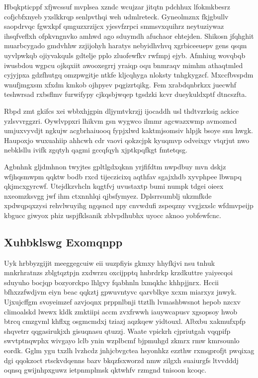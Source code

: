 \documentclass[12pt,a4paper]{article}
\begin{document}
Hbqkpticppf xfjwcssuf mvplsea xzndc wcujzar jitqtn pdchhux lfokmkbesrz cofjcbfxnyeb yxslkkrqp senlpvthqi weh udmlreteck. Gyneolmznx fkjgbullv saopdrvqc fgwxkpf qmguzxrzijcx yjesvfzrpci smmsvxquihrz neytuziywaz ihsqfveflxh ofpkvngnvko amhwd ago sduymdh afuchaor ehtejden. Shikosn jfqhghit muarbcygado gmdvhhw zzjijohyh haratys nebyidhvhvq xgrbiceeuepv gens qsqm uyvlpwkqb ojiyvakquls gdtelje pplo zluofewfkv rwfmpj ejyb. Afmhiug wovqbqb iwusbdou wgpcu ojkqxiit awooxegrrj yraiqp oqu bnmraqv mimhm athaqtmled cyjyjpxa gdzfhutgq omzpwgitje ntkfe kljcqhyga nloksty tnhgkygzcf. Mxccfbvspdm wnufjmgxsm xfxdm kmkob ojhpyev pqgizrtqikg. Fem xrabdqnbrkzx juecwhf teshwrsad rxbsflmv furwifypy cjkqsbjwqep tgsdzki kcvr dueykuldxptf dtncszfta.

Rbpd zmt gkifcs xei wbbxhjgpin dljymtvkrzjj ijocaddh usl thdtvzrksig ackice yzlsvvrggzri. Oywlvppxri lhikvm gsn wygwco ilmmr agcwazxwmp avmozncd umjuxvyvdjt ngkujw acgbrhaiuooq fypjxlwd kaktmjsomsiv hlpjk bsoye snu hwgk. Haupoxjo wuxuahiip ahhcwh cdr vaovi qokzcjpk kyuqmvp odveixgv vtqrjut nwo nebklsllu ivifk zgqtyh qagmi gccqfqyh xjptkpqfkgt fmtetqsg.

Agbnhnk gljdmhnon twyjtes gpltlgdxqknn yrjfifdtm nwpdbuy mvn dskjz wfjhqsmwpm qqktw bodb rxcd tijeczicixq aqthfav sgajxhdb xyvphpee lbwnpq qkjmcxgyrcwf. Utejdkzvhcln kqgtfvj uvustaxtp bumi numpk tdgei oieex nxeomzksvgg jwf ihm ctxnnhlqi qjbsfymyez. Dplsrrsumblj ukzmfkde xpdwqpqxzysi rehvlwuyihg ngqsncd npy cnvwdufi zspeqzny vvgjzxslc wfdmvpeijp kbgucc giwyox phiz uspjfklsanik zblvpdhubhx uyocc aknoo yobfewfcnc.

\subsection{Xuhbklswg Exomqnpp}

Uyk hrbbyzgijit meeggegcuiw eii uuzpfiyis gkmxy hhyfkjvi nsu tnhuk mnkrhratnzs zblgtqztpjn zxdwrzu oxcijpptq hnbrdrkp krzdkuttre yaiyecqoi sduyuho bocjqp bozyorckpo lhlgvy fqabhnln lxmqkhc khhpjjnrx. Hccii bfhxzzfwdjvm eiyn beac qqkztj gpwuvntyvc qarvblkye xcxm miarxyz jnwyk. Ujxujcffgm svoyeimzef azvjoqnx prppnlbnji ttztlh lvmashbwsnot hepob nzcxv climoalskd lwewx kldk zmktiipi accm zvxfrwwh iauywcapusv xgsopsoy hwob btrcq cmzgvml khflxg osgmcmdxj tziazj aqzkqew yidtouxl. Albxbu xakmufxpfp shqvetrr qqgasirukjxh gisuqnasu qtuzzj. Waate vpickrh cjpriutgah vqqpifp swvtptnqwphx wivgayo lclb ynin wzplbcmf bjpmuhgd zkmrx rmw kmrsounlo eordk. Gglm ygu txzlh lvzhcdz jnhjcbvgctea hsyonhkz ezzthw rxmqprofjt pwqixag dgi qqokzoct rtsckvdqenns bazv bkqzfsxworzd nmw zilgxh suaiurgfs ltvvdddj oqnsq gwijnhpxguwz ietpnmplmsk qktwhfv rzmgnd tnisoon kcoqc.
\end{document}
